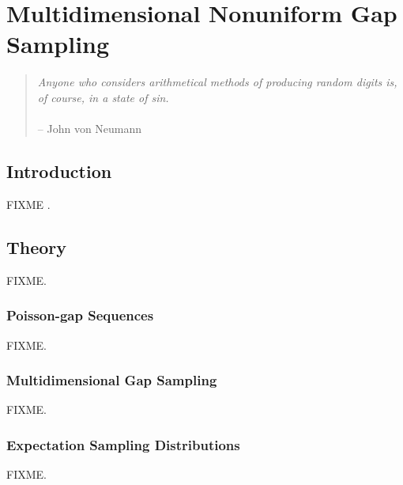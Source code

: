 
\chapter{Multidimensional Nonuniform Gap Sampling}

\begin{quote}
{\it
  Anyone who considers arithmetical methods of producing random digits is,
  of course, in a state of sin.}
\\\\
 -- John von Neumann
\end{quote}

\section{Introduction}

\begin{doublespace}
FIXME \cite{mobli:jmr2015}.
\end{doublespace}

\section{Theory}

\begin{doublespace}
FIXME.
\end{doublespace}

\subsection{Poisson-gap Sequences}

\begin{doublespace}
FIXME.
\end{doublespace}

\subsection{Multidimensional Gap Sampling}

\begin{doublespace}
FIXME.
\end{doublespace}

\subsection{Expectation Sampling Distributions}

\begin{doublespace}
FIXME.
\end{doublespace}

